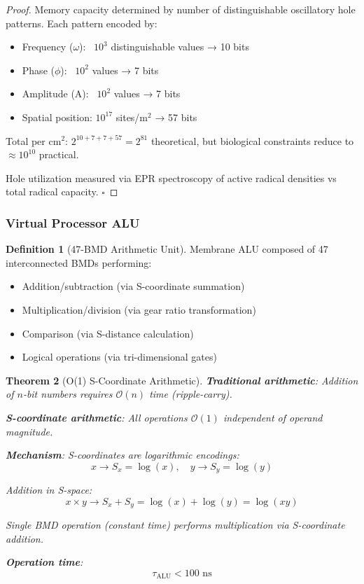 \documentclass[11pt,a4paper]{article}
\newtheorem{theorem}{Theorem}[section]
\theoremstyle{definition}
\newtheorem{definition}[theorem]{Definition}
\theoremstyle{remark}
\begin{document}
\begin{proof}
Memory capacity determined by number of distinguishable oscillatory hole patterns. Each pattern encoded by:
\begin{itemize}
\item Frequency ($\omega$): ~$10^3$ distinguishable values → 10 bits
\item Phase ($\phi$): ~$10^2$ values → 7 bits
\item Amplitude (A): ~$10^2$ values → 7 bits
\item Spatial position: $10^{17}$ sites/m$^2$ → 57 bits
\end{itemize}

Total per cm$^2$: $2^{10+7+7+57} = 2^{81}$ theoretical, but biological constraints reduce to $\approx 10^{10}$ practical.

Hole utilization measured via EPR spectroscopy of active radical densities vs total radical capacity. $\square$
\end{proof}

\subsubsection{Virtual Processor ALU}

\begin{definition}[47-BMD Arithmetic Unit]
Membrane ALU composed of 47 interconnected BMDs performing:
\begin{itemize}
\item Addition/subtraction (via S-coordinate summation)
\item Multiplication/division (via gear ratio transformation)
\item Comparison (via S-distance calculation)
\item Logical operations (via tri-dimensional gates)
\end{itemize}
\end{definition}

\begin{theorem}[O(1) S-Coordinate Arithmetic]
\textbf{Traditional arithmetic}: Addition of $n$-bit numbers requires $\mathcal{O}(n)$ time (ripple-carry).

\textbf{S-coordinate arithmetic}: All operations $\mathcal{O}(1)$ independent of operand magnitude.

\textbf{Mechanism}: S-coordinates are \textit{logarithmic encodings}:
\begin{equation}
x \rightarrow S_x = \log(x), \quad y \rightarrow S_y = \log(y)
\end{equation}

Addition in S-space:
\begin{equation}
x \times y \rightarrow S_x + S_y = \log(x) + \log(y) = \log(xy)
\end{equation}

Single BMD operation (constant time) performs multiplication via S-coordinate addition.

\textbf{Operation time}:
\begin{equation}
\tau_{\text{ALU}} < 100 \text{ ns}
\end{equation}
\end{theorem}
\end{document}
